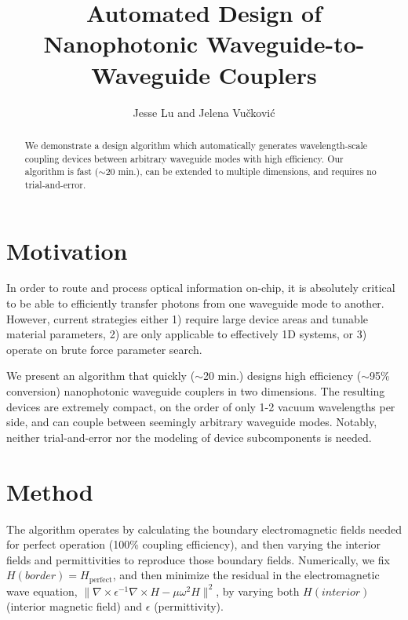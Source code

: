 \documentclass[letterpaper,10pt]{article}
\begin{document}
\title{Automated Design of Nanophotonic Waveguide-to-Waveguide Couplers}
\author{Jesse Lu and Jelena Vu\v{c}kovi\'{c}}
\address{Stanford University, Stanford, California, USA.}

\maketitle
\begin{abstract}
We demonstrate a design algorithm which automatically generates 
wavelength-scale coupling devices between arbitrary waveguide modes with high
efficiency.
Our algorithm is fast ($\sim$20 min.), can be extended to multiple dimensions,
 and requires no trial-and-error.
\end{abstract}

\section{Motivation}
In order to route and process optical information on-chip, it is absolutely
critical to be able to efficiently transfer photons from one waveguide mode
to another.
However, current strategies either 
1) require large device areas and tunable material parameters,
2) are only applicable to effectively 1D systems, or 
3) operate on brute force parameter search.

We present an algorithm that quickly ($\sim$20 min.) designs high efficiency
($\sim$95\% conversion) nanophotonic waveguide couplers in two dimensions.
The resulting devices are extremely compact, on the order of only 1-2 vacuum 
wavelengths per side, and can couple between seemingly arbitrary waveguide 
modes.
Notably, neither trial-and-error nor the modeling of device subcomponents 
is needed.

\section{Method}
The algorithm operates by calculating the boundary electromagnetic fields
needed for perfect operation (100\% coupling efficiency), and then varying the 
interior fields and permittivities to reproduce those boundary fields.  
Numerically, we fix $H({border}) = H_\text{perfect}$,
and then minimize the residual in the electromagnetic wave equation,
$\| \nabla \times \epsilon^{-1} \nabla \times H - \mu \omega^2 H \|^2$, 
by varying both $H({interior})$ (interior magnetic field) and 
$\epsilon$ (permittivity).
\end{document}

